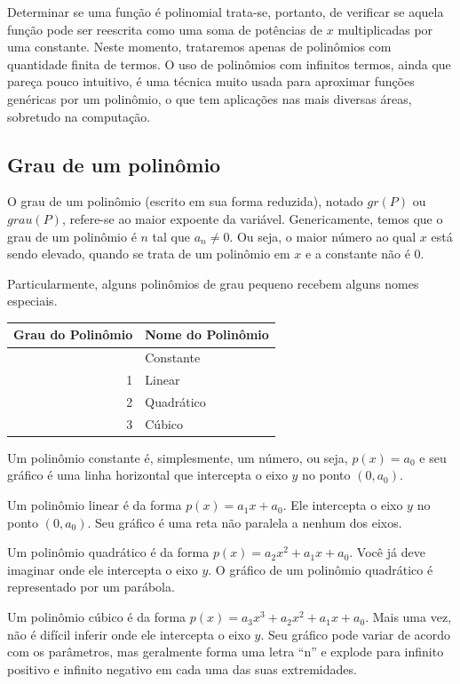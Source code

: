 \documentclass[
  portuguese,
  letterpaper,
  DIV=11,
  numbers=noendperiod]{scrreport}
\begin{document}
Determinar se uma função é polinomial trata-se, portanto, de verificar
se aquela função pode ser reescrita como uma soma de potências de \(x\)
multiplicadas por uma constante. Neste momento, trataremos apenas de
polinômios com quantidade finita de termos. O uso de polinômios com
infinitos termos, ainda que pareça pouco intuitivo, é uma técnica muito
usada para aproximar funções genéricas por um polinômio, o que tem
aplicações nas mais diversas áreas, sobretudo na computação.

\subsection{Grau de um polinômio}\label{grau-de-um-polinuxf4mio}

O grau de um polinômio (escrito em sua forma reduzida), notado \(gr(P)\)
ou \(grau(P)\), refere-se ao maior expoente da variável. Genericamente,
temos que o grau de um polinômio é \(n\) tal que \(a_n \neq 0\). Ou
seja, o maior número ao qual \(x\) está sendo elevado, quando se trata
de um polinômio em \(x\) e a constante não é 0.

Particularmente, alguns polinômios de grau pequeno recebem alguns nomes
especiais.

\begin{longtable}[]{@{}rl@{}}
\toprule\noalign{}
Grau do Polinômio & Nome do Polinômio \\
\midrule\noalign{}
\endhead
\bottomrule\noalign{}
\endlastfoot
0 & Constante \\
1 & Linear \\
2 & Quadrático \\
3 & Cúbico \\
\end{longtable}

Um polinômio constante é, simplesmente, um número, ou seja, \(p(x)=a_0\)
e seu gráfico é uma linha horizontal que intercepta o eixo \(y\) no
ponto \((0,a_0)\).

Um polinômio linear é da forma \(p(x) = a_1x+a_0\). Ele intercepta o
eixo \(y\) no ponto \((0,a_0)\). Seu gráfico é uma reta não paralela a
nenhum dos eixos.

Um polinômio quadrático é da forma \(p(x) = a_2x^2+a_1x+a_0\). Você já
deve imaginar onde ele intercepta o eixo \(y\). O gráfico de um
polinômio quadrático é representado por um parábola.

Um polinômio cúbico é da forma \(p(x) = a_3x^3+a_2x^2+a_1x+a_0\). Mais
uma vez, não é difícil inferir onde ele intercepta o eixo \(y\). Seu
gráfico pode variar de acordo com os parâmetros, mas geralmente forma
uma letra ``n'' e explode para infinito positivo e infinito negativo em
cada uma das suas extremidades.
\end{document}
